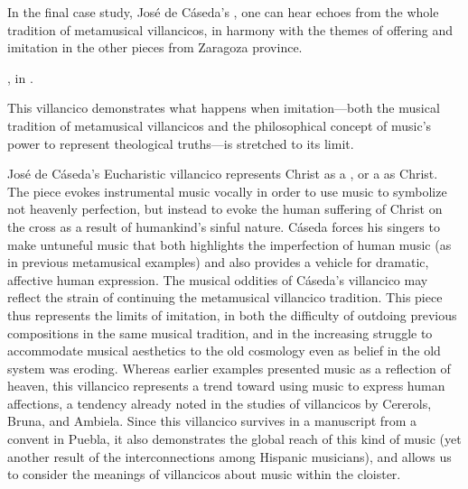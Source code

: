 In the final case study, José de Cáseda's , one can
hear echoes from the whole tradition of metamusical villancicos, in harmony
with the themes of offering and imitation in the other pieces from Zaragoza
province.%
\begin{Footnote} 
    , in \autocite{Cashner:WLSCM32}.
\end{Footnote}
This villancico demonstrates what happens when imitation---both the musical
tradition of metamusical villancicos and the philosophical concept of music's
power to represent theological truths---is stretched to its limit.

José de Cáseda's Eucharistic villancico  represents
Christ as a , or a  as Christ.
The piece evokes instrumental music vocally in order to use music to symbolize
not heavenly perfection, but instead to evoke the human suffering of Christ on
the cross as a result of humankind's sinful nature.
Cáseda forces his singers to make untuneful music that both highlights the
imperfection of human music (as in previous metamusical examples) and also
provides a vehicle for dramatic, affective human expression. 
The musical oddities of Cáseda's villancico may reflect the strain of
continuing the metamusical villancico tradition.
This piece thus represents the limits of imitation, in both the difficulty of
outdoing previous compositions in the same musical tradition, and in the
increasing struggle to accommodate musical aesthetics to the old cosmology even
as belief in the old system was eroding.
Whereas earlier examples presented music as a reflection of heaven, this
villancico represents a trend toward using music to express human affections, a
tendency already noted in the studies of villancicos by Cererols, Bruna, and
Ambiela.
Since this villancico survives in a manuscript from a convent in Puebla, it
also demonstrates the global reach of this kind of music (yet another result of
the interconnections among Hispanic musicians), and allows us to consider the
meanings of villancicos about music within the cloister.

